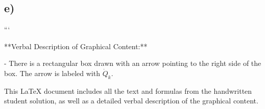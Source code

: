 \subsection*{e)}

```

**Verbal Description of Graphical Content:**

- There is a rectangular box drawn with an arrow pointing to the right side of the box. The arrow is labeled with \(\dot{Q}_k\).

This LaTeX document includes all the text and formulas from the handwritten student solution, as well as a detailed verbal description of the graphical content.